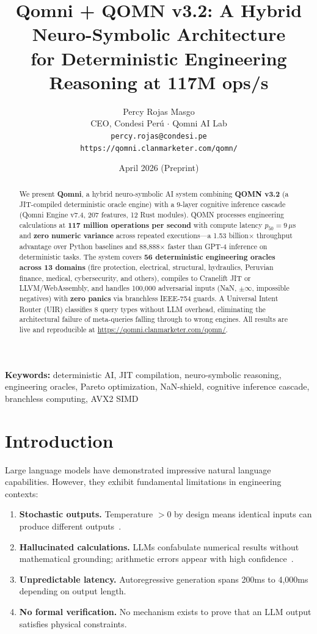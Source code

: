 \documentclass[11pt]{article}
\title{\textbf{Qomni + QOMN v3.2: A Hybrid Neuro-Symbolic Architecture\\
for Deterministic Engineering Reasoning at 117M ops/s}}
\author{
    Percy Rojas Masgo \\
    CEO, Condesi Per\'u $\cdot$ Qomni AI Lab \\
    \texttt{percy.rojas@condesi.pe} \\
    \texttt{https://qomni.clanmarketer.com/qomn/}
}
\date{April 2026 \quad (Preprint)}
\begin{document}
\maketitle

\begin{abstract}
We present \textbf{Qomni}, a hybrid neuro-symbolic AI system combining
\textbf{QOMN v3.2} (a JIT-compiled deterministic oracle engine) with a
9-layer cognitive inference cascade (Qomni Engine v7.4, 207 features, 12 Rust modules).
QOMN processes engineering calculations at \textbf{117 million operations per second}
with compute latency $p_{50} = 9\,\mu$s and \textbf{zero numeric variance} across
repeated executions---a 1.53 billion$\times$ throughput advantage over Python baselines
and 88,888$\times$ faster than GPT-4 inference on deterministic tasks.
The system covers \textbf{56 deterministic engineering oracles across 13 domains}
(fire protection, electrical, structural, hydraulics, Peruvian finance, medical,
cybersecurity, and others), compiles to Cranelift JIT or LLVM/WebAssembly, and
handles 100,000 adversarial inputs (NaN, $\pm\infty$, impossible negatives) with
\textbf{zero panics} via branchless IEEE-754 guards.
A Universal Intent Router (UIR) classifies 8 query types without LLM overhead,
eliminating the architectural failure of meta-queries falling through to wrong engines.
All results are live and reproducible at
\url{https://qomni.clanmarketer.com/qomn/}.
\end{abstract}

\textbf{Keywords:} deterministic AI, JIT compilation, neuro-symbolic reasoning,
engineering oracles, Pareto optimization, NaN-shield, cognitive inference cascade,
branchless computing, AVX2 SIMD

\section{Introduction}

Large language models have demonstrated impressive natural language capabilities.
However, they exhibit fundamental limitations in engineering contexts:

\begin{enumerate}
\item \textbf{Stochastic outputs.} Temperature $>0$ by design means identical
      inputs can produce different outputs~\cite{openai2023gpt4}.
\item \textbf{Hallucinated calculations.} LLMs confabulate numerical results
      without mathematical grounding; arithmetic errors appear with high
      confidence~\cite{bubeck2023sparks}.
\item \textbf{Unpredictable latency.} Autoregressive generation spans 200ms
      to 4,000ms depending on output length.
\item \textbf{No formal verification.} No mechanism exists to prove that an LLM
      output satisfies physical constraints.
\end{enumerate}
\end{document}
